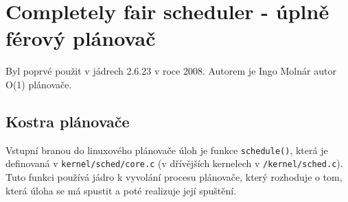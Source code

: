 \documentclass[a4paper,12pt]{article}
\begin{document}
\section{Completely fair scheduler - úplně férový plánovač}

Byl poprvé použit v jádrech 2.6.23 v roce 2008. Autorem je Ingo Molnár autor O(1) plánovače.

\subsection{Kostra plánovače}
Vstupní branou do linuxového plánovače úloh je funkce \verb#schedule()#, která je definovaná v \verb#kernel/sched/core.c# (v dřívějších kernelech v \verb#/kernel/sched.c#). Tuto funkci používá jádro k vyvolání procesu plánovače, který rozhoduje o tom, která úloha se má spustit a poté realizuje její spuštění. 
\end{document}
